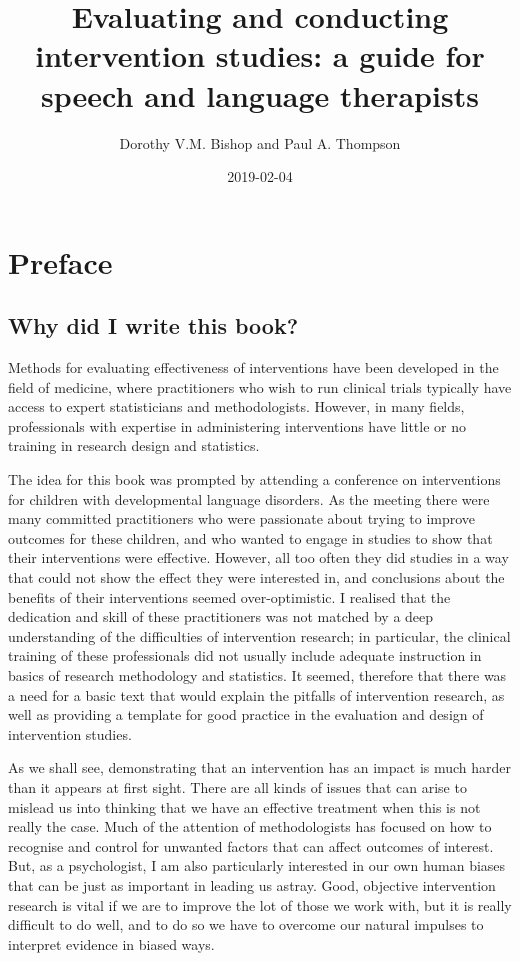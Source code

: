 \documentclass[]{book}
\title{Evaluating and conducting intervention studies: a guide for speech and language therapists}
\author{Dorothy V.M. Bishop and Paul A. Thompson}
\date{2019-02-04}
\begin{document}
\maketitle

{
\setcounter{tocdepth}{1}
\tableofcontents
}
\hypertarget{preface}{%
\chapter*{Preface}\label{preface}}

\hypertarget{why-did-i-write-this-book}{%
\section*{Why did I write this book?}\label{why-did-i-write-this-book}}

Methods for evaluating effectiveness of interventions have been developed in the field of medicine, where practitioners who wish to run clinical trials typically have access to expert statisticians and methodologists. However, in many fields, professionals with expertise in administering interventions have little or no training in research design and statistics.

The idea for this book was prompted by attending a conference on interventions for children with developmental language disorders. As the meeting there were many committed practitioners who were passionate about trying to improve outcomes for these children, and who wanted to engage in studies to show that their interventions were effective. However, all too often they did studies in a way that could not show the effect they were interested in, and conclusions about the benefits of their interventions seemed over-optimistic. I realised that the dedication and skill of these practitioners was not matched by a deep understanding of the difficulties of intervention research; in particular, the clinical training of these professionals did not usually include adequate instruction in basics of research methodology and statistics. It seemed, therefore that there was a need for a basic text that would explain the pitfalls of intervention research, as well as providing a template for good practice in the evaluation and design of intervention studies.

As we shall see, demonstrating that an intervention has an impact is much harder than it appears at first sight. There are all kinds of issues that can arise to mislead us into thinking that we have an effective treatment when this is not really the case. Much of the attention of methodologists has focused on how to recognise and control for unwanted factors that can affect outcomes of interest. But, as a psychologist, I am also particularly interested in our own human biases that can be just as important in leading us astray. Good, objective intervention research is vital if we are to improve the lot of those we work with, but it is really difficult to do well, and to do so we have to overcome our natural impulses to interpret evidence in biased ways.
\end{document}
